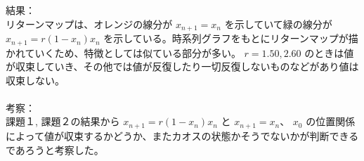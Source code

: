 結果：\\
リターンマップは、オレンジの線分が $x_{n+1} = x_n$ を示していて緑の線分が$x_{n+1} = r(1 −x_n)x_n$ を示している。時系列グラフをもとにリターンマップが描かれていくため、特徴としては似ている部分が多い。 $r = 1.50, 2.60$ のときは値が収束していき、その他では値が反復したり一切反復しないものなどがあり値は収束しない。\\
\\
考察：\\
課題１, 課題２の結果から $x_{n+1} = r(1 −x_n)x_n$ と $x_{n+1} = x_n$、 $x_0$ の位置関係によって値が収束するかどうか、またカオスの状態かそうでないかが判断できるであろうと考察した。
